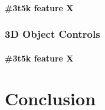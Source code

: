 \documentclass[10pt]{extarticle} %
\begin{document}
    \paragraph{\#3t5k feature X}

    \subsubsection{3D Object Controls}
    \paragraph{\#3t5k feature X}

    \newpage

    \section {Conclusion}

    \newpage

\end{document}
